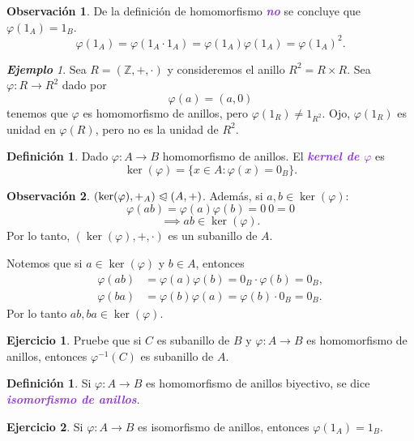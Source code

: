 \documentclass{article}
\theoremstyle{definition}
\newtheorem{definition}[theorem]{Definición}
\newtheorem{exercise}{Ejercicio}
\newtheorem*{obs}{Observación}
\theoremstyle{remark}
\newtheorem{example}[theorem]{\textbf{Ejemplo}}
\numberwithin{equation}{section}
\newcommand{\Z}{\mathbb{Z}}
\newcommand{\vphi}{\varphi}
\renewcommand{\c}{\cdot}
\newcommand{\normal}{\trianglelefteqslant}
\newcommand{\wea}[1]{\textcolor{BlueViolet}{\textbf{\emph{#1}}}}
\begin{document}
\begin{obs}
  De la definición de homomorfismo \wea{no} se concluye que $\vphi(1_A) = 1_B$. 
  \[ \vphi(1_A) = \vphi(1_A \c 1_A) = \vphi(1_A) \vphi(1_A) = \vphi(1_A)^2. \]
\end{obs}

\begin{example}
  Sea $R = (\Z,+,\c)$ y consideremos el anillo $R^2 = R \times R$. Sea $\vphi \colon R \to R^2$ dado por 
  \[ \vphi(a) = (a,0) \]
  tenemos que $\vphi$ es homomorfismo de anillos, pero $\vphi(1_R) \neq 1_{R^2}$.
  Ojo, $\vphi(1_R)$ es unidad en $\vphi(R)$, pero no es la unidad de $R^2$.
\end{example}

\begin{definition}
  Dado $\vphi \colon A \to B$ homomorfismo de anillos. El \wea{kernel de $\vphi$} es 
  \[ \ker(\vphi) = \{x \in A \colon \vphi(x) = 0_B\}. \]
\end{definition}

\begin{obs}
  $(\ker(\vphi),+_A) \normal (A,+)$.
  Además, si $a,b \in \ker(\vphi)$: 
  \[ \vphi(ab) = \vphi(a) \vphi(b) = 0 \ 0 = 0 \]
  \[ \implies ab \in \ker(\vphi). \]
  Por lo tanto, $(\ker(\vphi),+,\c)$ es un subanillo de $A$.

  Notemos que si $a \in \ker(\vphi)$ y $b \in A$, entonces 
  \begin{align*}
      \vphi(ab) &= \vphi(a) \vphi(b) = 0_B \c \vphi(b) = 0_B, \\
      \vphi(ba) &= \vphi(b) \vphi(a) = \vphi(b) \c 0_B = 0_B.
  \end{align*}
  Por lo tanto $ab,ba \in \ker(\vphi)$.
\end{obs}

\begin{exercise}
  Pruebe que si $C$ es subanillo de $B$ y $\vphi \colon A \to B$ es homomorfismo de anillos, entonces $\vphi^{-1}(C)$ es subanillo de $A$.
\end{exercise}

\begin{definition}
  Si $\vphi \colon A \to B$ es homomorfismo de anillos biyectivo, se dice \wea{isomorfismo de anillos}. %
\end{definition}

\begin{exercise}
  Si $\vphi \colon A \to B$ es isomorfismo de anillos, entonces $\vphi(1_A) = 1_B$.
\end{exercise}
\end{document}
